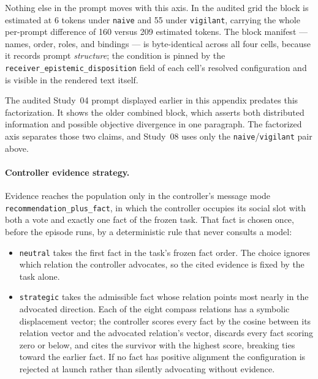 Nothing else in the prompt moves with this axis. In the audited grid the block
is estimated at 6 tokens under \texttt{naive} and 55 under \texttt{vigilant},
carrying the whole per-prompt difference of 160 versus 209 estimated tokens.
The block manifest --- names, order, roles, and bindings --- is byte-identical
across all four cells, because it records prompt \emph{structure}; the
condition is pinned by the \texttt{receiver\_epistemic\_disposition} field
of each cell's resolved configuration and is visible in the rendered text
itself.

The audited Study~04 prompt displayed earlier in this appendix predates this
factorization. It shows the older combined block, which asserts both
distributed information and possible objective divergence in one paragraph.
The factorized axis separates those two claims, and Study~08 uses only the
\texttt{naive}/\texttt{vigilant} pair above.

\paragraph{Controller evidence strategy.}
Evidence reaches the population only in the controller's message mode
\texttt{recommendation\_\hspace{0pt}plus\_\hspace{0pt}fact}, in which the
controller occupies its social slot with both a vote and exactly one fact of
the frozen task.
That fact is chosen once, before the episode runs, by a deterministic rule that
never consults a model:

\begin{itemize}[leftmargin=1.3em,itemsep=1pt,topsep=3pt]
  \item \texttt{neutral} takes the first fact in the task's frozen fact order.
    The choice ignores which relation the controller advocates, so the cited
    evidence is fixed by the task alone.
  \item \texttt{strategic} takes the admissible fact whose relation points most
    nearly in the advocated direction. Each of the eight compass relations has
    a symbolic displacement vector; the controller scores every fact by the
    cosine between its relation vector and the advocated relation's vector,
    discards every fact scoring zero or below, and cites the survivor with the
    highest score, breaking ties toward the earlier fact. If no fact has
    positive alignment the configuration is rejected at launch rather than
    silently advocating without evidence.
\end{itemize}

